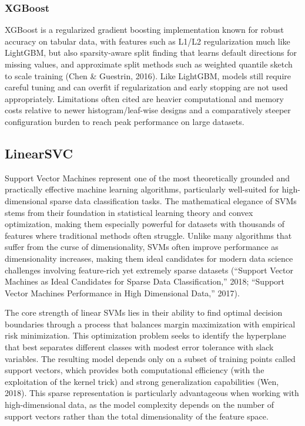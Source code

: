 \documentclass[
  titlepage]{article}
\begin{document}
\subsubsection{XGBoost}\label{xgboost}

XGBoost is a regularized gradient boosting implementation known for
robust accuracy on tabular data, with features such as L1/L2
regularization much like LightGBM, but also sparsity-aware split finding
that learns default directions for missing values, and approximate split
methods such as weighted quantile sketch to scale training (Chen \&
Guestrin, 2016). Like LightGBM, models still require careful tuning and
can overfit if regularization and early stopping are not used
appropriately. Limitations often cited are heavier computational and
memory costs relative to newer histogram/leaf-wise designs and a
comparatively steeper configuration burden to reach peak performance on
large datasets.

\subsection{LinearSVC}\label{linearsvc}

Support Vector Machines represent one of the most theoretically grounded
and practically effective machine learning algorithms, particularly
well-suited for high-dimensional sparse data classification tasks. The
mathematical elegance of SVMs stems from their foundation in statistical
learning theory and convex optimization, making them especially powerful
for datasets with thousands of features where traditional methods often
struggle. Unlike many algorithms that suffer from the curse of
dimensionality, SVMs often improve performance as dimensionality
increases, making them ideal candidates for modern data science
challenges involving feature-rich yet extremely sparse datasets
({``Support Vector Machines as Ideal Candidates for Sparse Data
Classification,''} 2018; {``Support Vector Machines Performance in High
Dimensional Data,''} 2017).

The core strength of linear SVMs lies in their ability to find optimal
decision boundaries through a process that balances margin maximization
with empirical risk minimization. This optimization problem seeks to
identify the hyperplane that best separates different classes with
modest error tolerance with slack variables. The resulting model depends
only on a subset of training points called support vectors, which
provides both computational efficiency (with the exploitation of the
kernel trick) and strong generalization capabilities (Wen, 2018). This
sparse representation is particularly advantageous when working with
high-dimensional data, as the model complexity depends on the number of
support vectors rather than the total dimensionality of the feature
space.
\end{document}
